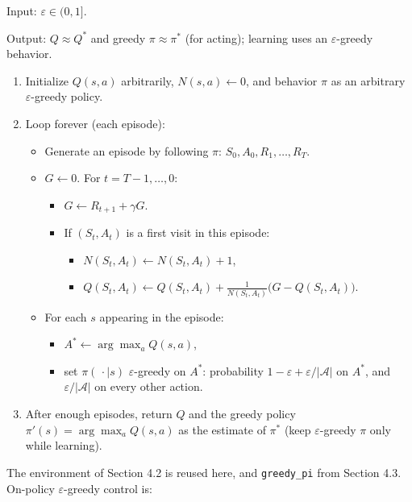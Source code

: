 \begin{implnote}
Input: $\varepsilon\in(0,1]$.

Output: $Q\approx Q^*$ and greedy $\pi\approx\pi^*$ (for acting); learning uses an $\varepsilon$-greedy behavior.

\begin{enumerate}
\item Initialize $Q(s,a)$ arbitrarily, $N(s,a)\leftarrow 0$, and behavior $\pi$ as an arbitrary $\varepsilon$-greedy policy.
\item Loop forever (each episode):
\begin{itemize}
\item Generate an episode by following $\pi$: $S_0,A_0,R_1,\ldots,R_T$.
\item $G\leftarrow 0$. For $t=T{-}1,\ldots,0$:
\begin{itemize}
\item $G\leftarrow R_{t+1}+\gamma G$.
\item If $(S_t,A_t)$ is a first visit in this episode:
\begin{itemize}
\item $N(S_t,A_t)\leftarrow N(S_t,A_t)+1$,
\item $Q(S_t,A_t)\leftarrow Q(S_t,A_t)+\frac{1}{N(S_t,A_t)}\bigl(G-Q(S_t,A_t)\bigr)$.
\end{itemize}
\end{itemize}
\item For each $s$ appearing in the episode:
\begin{itemize}
\item $A^*\leftarrow\arg\max_a Q(s,a)$,
\item set $\pi(\,\cdot\mid s)$ $\varepsilon$-greedy on $A^*$: probability $1-\varepsilon+\varepsilon/|\mathcal{A}|$ on $A^*$, and $\varepsilon/|\mathcal{A}|$ on every other action.
\end{itemize}
\end{itemize}
\item After enough episodes, return $Q$ and the greedy policy $\pi'(s)=\arg\max_a Q(s,a)$ as the estimate of $\pi^*$ (keep $\varepsilon$-greedy $\pi$ only while learning).
\end{enumerate}

\end{implnote}

The environment of Section 4.2 is reused here, and \texttt{greedy\_pi} from Section 4.3. On-policy $\varepsilon$-greedy control is:

